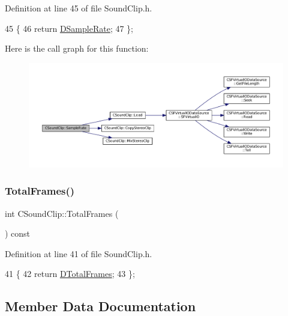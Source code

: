 Definition at line 45 of file Sound\+Clip.\+h.


\begin{DoxyCode}
45                               \{
46             \textcolor{keywordflow}{return} \hyperlink{classCSoundClip_ac1b9306140da2f89f6178833e0a9b887}{DSampleRate};  
47         \};
\end{DoxyCode}
Here is the call graph for this function\+:\nopagebreak
\begin{figure}[H]
\begin{center}
\leavevmode
\includegraphics[width=350pt]{classCSoundClip_ac89dc3d2f25a43fcd97268ec9828f709_cgraph}
\end{center}
\end{figure}
\hypertarget{classCSoundClip_abcd12e4989ecf6f31011e65c27c994f9}{}\label{classCSoundClip_abcd12e4989ecf6f31011e65c27c994f9} 
\subsubsection{\texorpdfstring{Total\+Frames()}{TotalFrames()}}
{\footnotesize\ttfamily int C\+Sound\+Clip\+::\+Total\+Frames (\begin{DoxyParamCaption}{ }\end{DoxyParamCaption}) const\hspace{0.3cm}{\ttfamily [inline]}}



Definition at line 41 of file Sound\+Clip.\+h.


\begin{DoxyCode}
41                                \{
42             \textcolor{keywordflow}{return} \hyperlink{classCSoundClip_ab0d9eb261d09fa2a106658276f37285b}{DTotalFrames};  
43         \};
\end{DoxyCode}


\subsection{Member Data Documentation}
\hypertarget{classCSoundClip_a01aaf0b87b9b8226c77a6931d03d6a64}{}\label{classCSoundClip_a01aaf0b87b9b8226c77a6931d03d6a64} 
